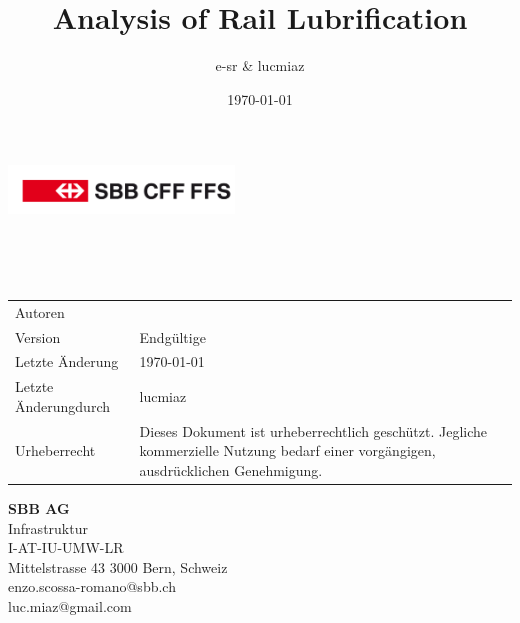 \pagestyle{title}
\author{e-sr \& lucmiaz}
\date{\today}
\title{Analysis of Rail Lubrification}

\begin{titlepage}
	\sffamily
	\begin{flushright}
	\includegraphics[width=60mm]{packages/logo.pdf}
	\end{flushright}
	\vspace{10\baselineskip}
	\parbox{165mm}{{\noindent\Huge\bfseries \thetitle}\\[1\baselineskip]
	\noindent\Large\bfseries }
	\\[8\baselineskip]
	{\footnotesize
	\begin{tabularx}{150mm}{@{}l X}
		Autoren 		& \theauthor \\
		Version 		& Endgültige\\
		Letzte Änderung	& \today\\
		Letzte Änderungdurch& lucmiaz\\
		Urheberrecht 	& Dieses Dokument ist urheberrechtlich geschützt. Jegliche kommerzielle Nutzung bedarf einer vorgängigen, ausdrücklichen Genehmigung.\\
	\end{tabularx}
	}
	\vfill 
	\parbox{100mm}{\small
	\textbf{SBB AG}\\
	Infrastruktur \\ 
	I-AT-IU-UMW-LR\\
	Mittelstrasse 43 3000 Bern, Schweiz\\
	enzo.scossa-romano@sbb.ch\\
	luc.miaz@gmail.com}
\end{titlepage}
\restoregeometry
\pagestyle{body}

